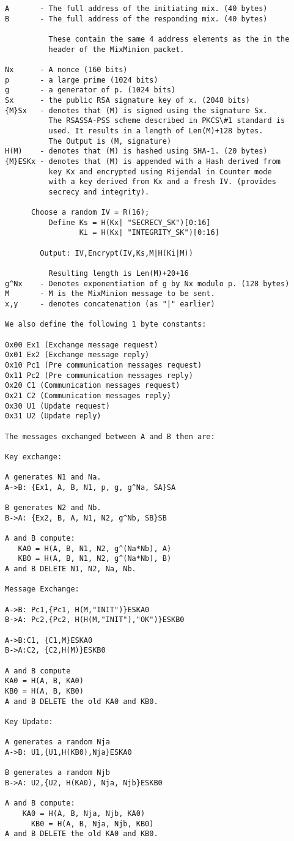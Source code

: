 \documentclass{article}
\begin{document}
\begin{verbatim}
A       - The full address of the initiating mix. (40 bytes)
B       - The full address of the responding mix. (40 bytes)

          These contain the same 4 address elements as the in the
          header of the MixMinion packet.

Nx      - A nonce (160 bits)
p       - a large prime (1024 bits)
g       - a generator of p. (1024 bits) 
Sx      - the public RSA signature key of x. (2048 bits)
{M}Sx   - denotes that (M) is signed using the signature Sx.
          The RSASSA-PSS scheme described in PKCS\#1 standard is 
          used. It results in a length of Len(M)+128 bytes.
          The Output is (M, signature)
H(M)    - denotes that (M) is hashed using SHA-1. (20 bytes)
{M}ESKx - denotes that (M) is appended with a Hash derived from
          key Kx and encrypted using Rijendal in Counter mode
          with a key derived from Kx and a fresh IV. (provides
          secrecy and integrity).

	  Choose a random IV = R(16);
          Define Ks = H(Kx| "SECRECY_SK")[0:16]
                 Ki = H(Kx| "INTEGRITY_SK")[0:16]
		 
	    Output: IV,Encrypt(IV,Ks,M|H(Ki|M))

          Resulting length is Len(M)+20+16
g^Nx    - Denotes exponentiation of g by Nx modulo p. (128 bytes)
M       - M is the MixMinion message to be sent.
x,y     - denotes concatenation (as "|" earlier)

We also define the following 1 byte constants:

0x00 Ex1 (Exchange message request)
0x01 Ex2 (Exchange message reply)
0x10 Pc1 (Pre communication messages request)
0x11 Pc2 (Pre communication messages reply)
0x20 C1 (Communication messages request)
0x21 C2 (Communication messages reply)
0x30 U1 (Update request)
0x31 U2 (Update reply)

The messages exchanged between A and B then are:

Key exchange:

A generates N1 and Na.
A->B: {Ex1, A, B, N1, p, g, g^Na, SA}SA

B generates N2 and Nb.
B->A: {Ex2, B, A, N1, N2, g^Nb, SB}SB

A and B compute:
   KA0 = H(A, B, N1, N2, g^(Na*Nb), A)
   KB0 = H(A, B, N1, N2, g^(Na*Nb), B)
A and B DELETE N1, N2, Na, Nb.

Message Exchange:

A->B: Pc1,{Pc1, H(M,"INIT")}ESKA0
B->A: Pc2,{Pc2, H(H(M,"INIT"),"OK")}ESKB0

A->B:C1, {C1,M}ESKA0
B->A:C2, {C2,H(M)}ESKB0

A and B compute
KA0 = H(A, B, KA0)
KB0 = H(A, B, KB0)
A and B DELETE the old KA0 and KB0.

Key Update:

A generates a random Nja
A->B: U1,{U1,H(KB0),Nja}ESKA0

B generates a random Njb
B->A: U2,{U2, H(KA0), Nja, Njb}ESKB0

A and B compute:
	KA0 = H(A, B, Nja, Njb, KA0)
      KB0 = H(A, B, Nja, Njb, KB0)
A and B DELETE the old KA0 and KB0.
\end{verbatim}
\end{document}
